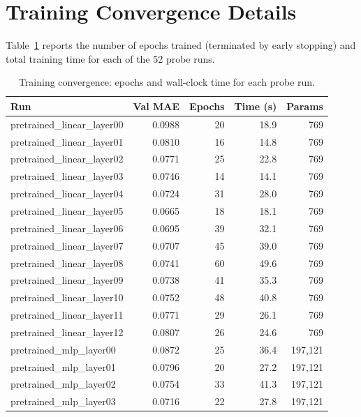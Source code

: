 \documentclass[11pt,a4paper]{article}
\begin{document}
\appendix
\section{Training Convergence Details}

Table~\ref{tab:training} reports the number of epochs trained (terminated by
early stopping) and total training time for each of the 52 probe runs.

\begin{table}[H]
\centering
\caption{Training convergence: epochs and wall-clock time for each probe run.}
\label{tab:training}
\small
\begin{tabular}{lrrrr}
\toprule
Run & Val MAE & Epochs & Time (s) & Params \\
\midrule
pretrained\_linear\_layer00 & 0.0988 & 20 & 18.9 & 769 \\
pretrained\_linear\_layer01 & 0.0810 & 16 & 14.8 & 769 \\
pretrained\_linear\_layer02 & 0.0771 & 25 & 22.8 & 769 \\
pretrained\_linear\_layer03 & 0.0746 & 14 & 14.1 & 769 \\
pretrained\_linear\_layer04 & 0.0724 & 31 & 28.0 & 769 \\
pretrained\_linear\_layer05 & 0.0665 & 18 & 18.1 & 769 \\
pretrained\_linear\_layer06 & 0.0695 & 39 & 32.1 & 769 \\
pretrained\_linear\_layer07 & 0.0707 & 45 & 39.0 & 769 \\
pretrained\_linear\_layer08 & 0.0741 & 60 & 49.6 & 769 \\
pretrained\_linear\_layer09 & 0.0738 & 41 & 35.3 & 769 \\
pretrained\_linear\_layer10 & 0.0752 & 48 & 40.8 & 769 \\
pretrained\_linear\_layer11 & 0.0771 & 29 & 26.1 & 769 \\
pretrained\_linear\_layer12 & 0.0807 & 26 & 24.6 & 769 \\
\midrule
pretrained\_mlp\_layer00 & 0.0872 & 25 & 36.4 & 197,121 \\
pretrained\_mlp\_layer01 & 0.0796 & 20 & 27.2 & 197,121 \\
pretrained\_mlp\_layer02 & 0.0754 & 33 & 41.3 & 197,121 \\
pretrained\_mlp\_layer03 & 0.0716 & 22 & 27.8 & 197,121 \\

\end{tabular}
\end{table}
\end{document}

